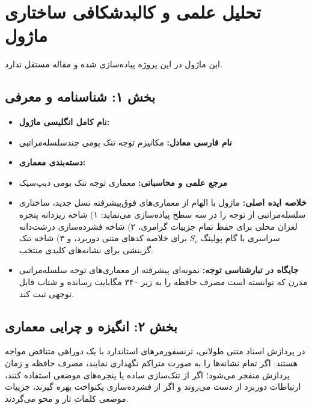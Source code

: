 \section{تحلیل علمی و کالبدشکافی ساختاری ماژول }

این ماژول در این پروژه پیاده‌سازی شده و مقاله مستقل ندارد.
\label{sec:nsa_attention}

\subsection*{بخش ۱: شناسنامه و معرفی }
\begin{itemize}
    \item \textbf{نام کامل انگلیسی ماژول:} 
    \item \textbf{نام فارسی معادل:} مکانیزم توجه تنک بومی چندسلسله‌مراتبی 
    \item \textbf{دسته‌بندی معماری:} 
    \item \textbf{مرجع علمی و محاسباتی:} معماری توجه تنک بومی دیپ‌سیک 
    \item \textbf{خلاصه ایده اصلی:} ماژول  با الهام از معماری‌های فوق‌پیشرفته نسل جدید، ساختاری سلسله‌مراتبی از توجه را در سه سطح پیاده‌سازی می‌نماید: ۱) شاخه ریزدانه پنجره لغزان محلی  برای حفظ تمام جزییات گرامری، ۲) شاخه فشرده‌سازی درشت‌دانه سراسری  با گام پولینگ $S_c$ برای خلاصه کدهای متنی دوربرد، و ۳) شاخه تنک گزینشی  برای نشانه‌های کلیدی منتخب.
    \item \textbf{جایگاه در تبارشناسی توجه:} نمونه‌ای پیشرفته از معماری‌های توجه سلسله‌مراتبی مدرن که توانسته است مصرف حافظه را به زیر ۳۴۰ مگابایت رسانده و شتاب قابل توجهی ثبت کند.
\end{itemize}

\subsection*{بخش ۲: انگیزه و چرایی معماری }
در پردازش اسناد متنی طولانی، ترنسفورمرهای استاندارد با یک دوراهی متناقض مواجه هستند: اگر تمام نشانه‌ها را به صورت متراکم نگهداری نمایند، مصرف حافظه و زمان پردازش منفجر می‌شود؛ اگر از تنک‌سازی ساده یا پنجره‌های موضعی استفاده کنند، ارتباطات دوربرد از دست می‌روند و اگر از فشرده‌سازی یکنواخت بهره گیرند، جزییات موضعی کلمات تار و محو می‌گردند.

